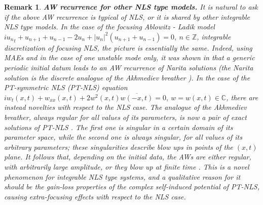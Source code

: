 \documentclass[12pt]{article}
\newcommand{\CC}{\mathbb C}
\newcommand{\ZZ}{{\mathbb Z}}
\newtheorem{remark}{Remark}
\begin{document}
\begin{remark}
{\bf AW recurrence for other NLS type models.} It is natural to ask if the above AW recurrence is typical of NLS, or it is shared by other integrable NLS type models. In the case of the focusing Ablowitz - Ladik model \cite{AblowLadik} $i {u_n}_t+u_{n+1}+u_{n-1}-2 u_n +|u_n|^2(u_{n+1}+u_{n-1})=0,~n\in\ZZ$, integrable discretization of focusing NLS, the picture is essentially the same. Indeed, using MAEs and in the case of one unstable mode only, it was shown in \cite{Coppini} that a generic periodic initial datum leads to an AW recurrence of Narita solutions (the Narita solution is the discrete analogue of the Akhmediev breather \cite{Narita,Akhmed7}). In the case of the PT-symmetric NLS (PT-NLS) equation \cite{AM1,AM2,AM3,AM4} $i w_t(x,t) +w_{xx}(x,t)+2 w^2(x,t)\overline{w(-x,t)}=0, \ w=w(x,t)\in\CC$, there are instead novelties with respect to the NLS case. The analogue of the Akhmediev breather, always regular for all values of its parameters, is now a pair of exact solutions of PT-NLS \cite{san1}. The first one is singular in a certain domain of its parameter space, while the second one is always singular, for all values of its arbitrary parameters; these singularities describe blow ups in points of the $(x,t)$ plane. It follows that, depending on the initial data, the AWs are either regular, with arbitrarily large amplitude, or they blow up at finite time \cite{san2}. This is a novel phenomenon for integrable NLS type systems, and a qualitative reason for it should be the gain-loss properties of the complex self-induced potential of PT-NLS, causing extra-focusing effects with respect to the NLS case.    
\end{remark}
\end{document}
